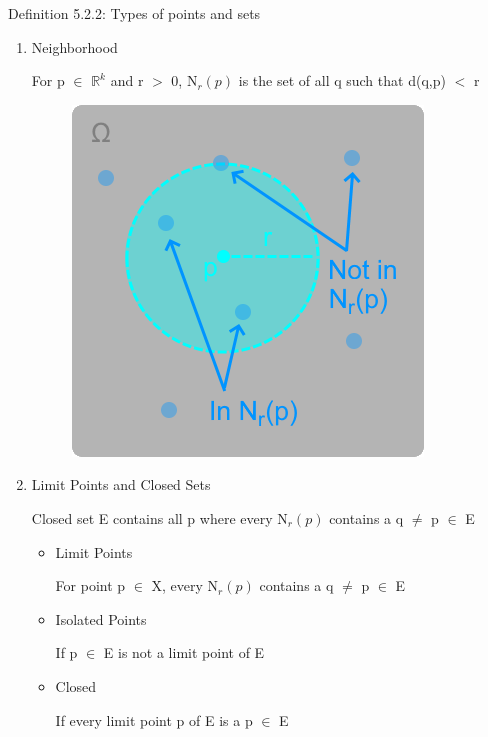 { \color{blue} Definition 5.2.2: Types of points and sets } 
	\begin{enumerate}[label=(\alph*), leftmargin=2cm, itemsep=0.4em]
		\item {\color{lblue} Neighborhood}

			\qquad For p $\in$ $\mathbb{R}^k$ and r $>$ 0, N$_r(p)$ is the set of all q
			such that d(q,p) $<$ r

			\begin{figure}[h]
				\centering
				\includegraphics[scale=0.45]{Images/5.2.2a.png}
			\end{figure}

		\item {\color{lblue} Limit Points and Closed Sets}

			\qquad Closed set E contains all p where every N$_r(p)$ contains
			a q $\neq$ p $\in$ E
			\begin{itemize}[leftmargin=1cm, itemsep=0.4em]
				\item Limit Points 

					\qquad For point p $\in$ X, every N$_r(p)$ contains a
					q $\neq$ p $\in$ E
				
				\item Isolated Points

					\qquad If p $\in$ E is not a limit point of E

				\item Closed

					\qquad If every limit point p of E is a p $\in$ E
			\end{itemize}


\end{enumerate}
